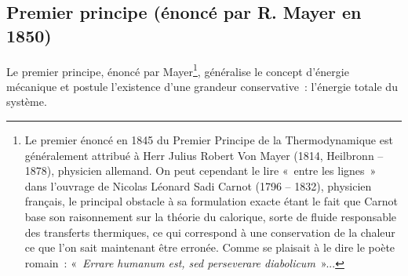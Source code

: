 \documentclass{article}
\begin{document}
\subsection{Premier principe (énoncé par R. Mayer en 1850)}
    Le premier principe, énoncé par Mayer\footnote{Le premier énoncé en 1845 du Premier Principe de la Thermodynamique est généralement attribué à Herr Julius Robert Von Mayer (1814, Heilbronn – 1878), physicien allemand. On peut cependant le lire «~entre les lignes~» dans l’ouvrage de Nicolas Léonard Sadi Carnot (1796 – 1832), physicien français, le principal obstacle à sa formulation exacte étant le fait que Carnot base son raisonnement sur la théorie du calorique, sorte de fluide responsable des transferts thermiques, ce qui correspond à une conservation de la chaleur ce que l’on sait maintenant être erronée. Comme se plaisait à le dire le poète romain~: «~\textit{Errare humanum est, sed perseverare diabolicum}~»...}, généralise le concept d’énergie mécanique et postule l’existence d’une grandeur conservative~: l’énergie totale du système.
    
\end{document}
